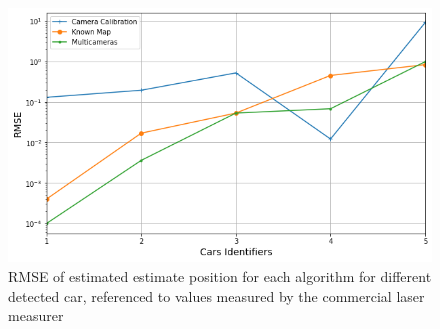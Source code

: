 \begin{figure}[H]
\centering
\includegraphics[scale=0.6]{imagens/plot.png}
\caption{RMSE of estimated estimate position for each algorithm for different detected car, referenced to values measured by the commercial laser measurer}
\label{fig:rmse}
\end{figure}